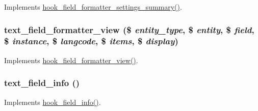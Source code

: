 \label{text_8module_a89eae3ac39a5f54983fa7e9f04d3ac85}
Implements \hyperlink{group__field__types_ga0cdef0fb8588dde07292df1b86f06d81}{hook\_\-field\_\-formatter\_\-settings\_\-summary()}. \hypertarget{text_8module_afc45ca296fcf7338ae6c3877b4d8b926}{
\subsubsection[{text\_\-field\_\-formatter\_\-view}]{\setlength{\rightskip}{0pt plus 5cm}text\_\-field\_\-formatter\_\-view (\$ {\em entity\_\-type}, \/  \$ {\em entity}, \/  \$ {\em field}, \/  \$ {\em instance}, \/  \$ {\em langcode}, \/  \$ {\em items}, \/  \$ {\em display})}}
\label{text_8module_afc45ca296fcf7338ae6c3877b4d8b926}
Implements \hyperlink{group__field__formatter_gaa588d99481fa147a1c88416e55fdfad6}{hook\_\-field\_\-formatter\_\-view()}. \hypertarget{text_8module_a22fe4380fedbc8da50c296248104a7bf}{
\subsubsection[{text\_\-field\_\-info}]{\setlength{\rightskip}{0pt plus 5cm}text\_\-field\_\-info ()}}
\label{text_8module_a22fe4380fedbc8da50c296248104a7bf}
Implements \hyperlink{group__field__types_gad3eb779f26f41b520f19af011ece3eb1}{hook\_\-field\_\-info()}.


